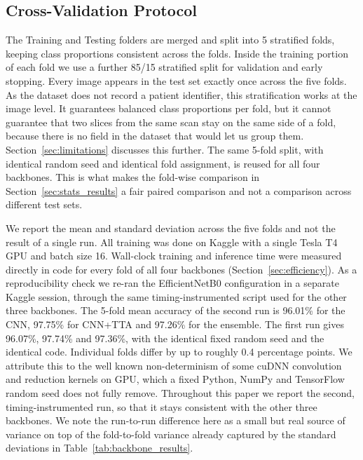 \documentclass[11pt]{article}
\begin{document}
\subsection{Cross-Validation Protocol}
\label{sec:cv_protocol}
The Training and Testing folders are merged and split into 5 stratified folds, keeping class proportions consistent across the folds. Inside the training portion of each fold we use a further 85/15 stratified split for validation and early stopping. Every image appears in the test set exactly once across the five folds. As the dataset does not record a patient identifier, this stratification works at the image level. It guarantees balanced class proportions per fold, but it cannot guarantee that two slices from the same scan stay on the same side of a fold, because there is no field in the dataset that would let us group them. Section~\ref{sec:limitations} discusses this further. The same 5-fold split, with identical random seed and identical fold assignment, is reused for all four backbones. This is what makes the fold-wise comparison in Section~\ref{sec:stats_results} a fair paired comparison and not a comparison across different test sets.

We report the mean and standard deviation across the five folds and not the result of a single run. All training was done on Kaggle with a single Tesla T4 GPU and batch size 16. Wall-clock training and inference time were measured directly in code for every fold of all four backbones (Section~\ref{sec:efficiency}). As a reproducibility check we re-ran the EfficientNetB0 configuration in a separate Kaggle session, through the same timing-instrumented script used for the other three backbones. The 5-fold mean accuracy of the second run is 96.01\% for the CNN, 97.75\% for CNN+TTA and 97.26\% for the ensemble. The first run gives 96.07\%, 97.74\% and 97.36\%, with the identical fixed random seed and the identical code. Individual folds differ by up to roughly 0.4 percentage points. We attribute this to the well known non-determinism of some cuDNN convolution and reduction kernels on GPU, which a fixed Python, NumPy and TensorFlow random seed does not fully remove. Throughout this paper we report the second, timing-instrumented run, so that it stays consistent with the other three backbones. We note the run-to-run difference here as a small but real source of variance on top of the fold-to-fold variance already captured by the standard deviations in Table~\ref{tab:backbone_results}.
\end{document}
